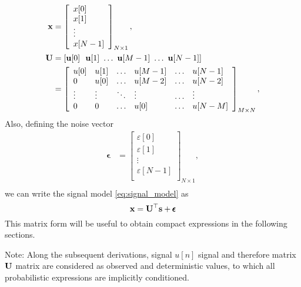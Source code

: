 \begin{align}
{\mathbf x} &= \left[\begin{array}{l}
                 x[0] \\ x[1] \\ \vdots \\ x[N-1] \\
            \end{array} \right]_{N\times 1},  \\
\nonumber
{\mathbf U} &= [{\mathbf u}[0]~~{\mathbf u}[1]~\ldots~{\mathbf u}[M-1]~\ldots~{\mathbf u}[N-1] ]\\
    &= \left[\begin{array}{llllll}
                u[0]  & u[1]   & \ldots & u[M-1] & \ldots & u[N-1] \\
                0     & u[0]   & \ldots & u[M-2] & \ldots & u[N-2] \\
               \vdots & \vdots & \ddots & \vdots & \ldots & \vdots \\
               0      & 0      & \ldots & u[0]   & \ldots & u[N-M] \\
              \end{array} \right]_{M\times N},
\end{align}
Also, defining the noise vector
\begin{align}
\pmb{\epsilon} &= \left[\begin{array}{l}
                 \varepsilon[0] \\ \varepsilon[1] \\ \vdots \\ \varepsilon[N-1] \\
            \end{array} \right]_{N\times 1},  \\
\end{align}
we can write the signal model \eqref{eq:signal_model} as
\begin{equation}
\label{eq:signal_model_vec}
{\mathbf x} ={\mathbf U}^\top {\mathbf s} + \pmb{\epsilon}
\end{equation}
This matrix form will be useful to obtain compact expressions in the following sections.

Note: Along the subsequent derivations, signal $u[n]$ signal and therefore matrix ${\mathbf U}$ matrix are considered as observed and deterministic values, to which all probabilistic expressions are implicitly conditioned.

